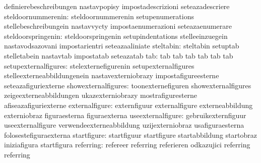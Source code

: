                                   definierebeschreibungen          nastavpopisy
                                  impostadescrizioni               seteazadescriere
              steldoornummerenin: steldoornummerenin               setupenumerations
                                  stellebeschreibungein            nastavvycty
                                  impostaenumerazioni              seteazaenumerare
              steldoorspringenin: steldoorspringenin               setupindentations
                                  stelleeinzuegein                 nastavodsazovani
                                  impostarientri                   seteazaaliniate
                       steltabin: steltabin                        setuptab
                                  stelletabein                     nastavtab
                                  impostatab                       seteazatab
                             tab: tab                              tab
                                  tab                              tab
                                  tab                              tab
            setupexternalfigures: stelexternefigurenin             setupexternalfigures
                                  stelleexterneabbildungenein      nastavexterniobrazy
                                  impostafigureesterne             seteazafiguriexterne
             showexternalfigures: toonexternefiguren               showexternalfigures
                                  zeigeexterneabbildungen          ukazexterniobrazy
                                  mostrafiguresterne               afiseazafiguriexterne
                  externalfigure: externfiguur                     externalfigure
                                  externeabbildung                 externiobraz
                                  figuraesterna                    figuraexterna
               useexternalfigure: gebruikexternfiguur              useexternalfigure
                                  verwendeexterneabbildung         uzijexterniobraz
                                  usafiguraesterna                 folosestefiguraexterna
                     startfigure: startfiguur                      startfigure
                                  startabbildung                   startobraz
                                  iniziafigura                     startfigura
                       referring: refereer                         referring
                                  referieren                       odkazujici
                                  referring                        referring %
